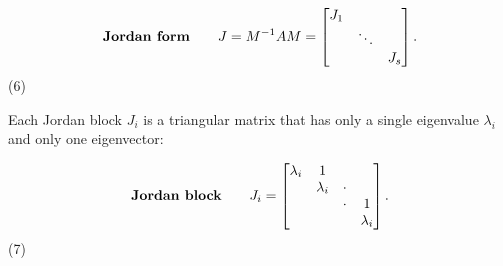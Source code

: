 \[\mbox{\bf Jordan form}\qquad J=M^{-1}AM=\begin{bmatrix}J_{1}&&\\ &\ddots&\\ &&J_{s}\end{bmatrix}.\] (6)

Each Jordan block \(J_{i}\) is a triangular matrix that has only a single eigenvalue \(\lambda_{i}\) and only one eigenvector:

\[\mbox{\bf Jordan block}\qquad J_{i}=\begin{bmatrix}\lambda_{i}&1&&\\ &\lambda_{i}&\cdot&\\ &&\cdot&1\\ &&&\lambda_{i}\end{bmatrix}.\] (7) 
